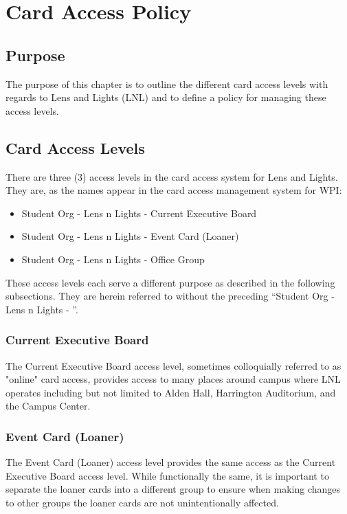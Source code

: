 \documentclass[12pt,letterpaper,oneside]{book}
\begin{document}
\chapter{Card Access Policy}

\section{Purpose}
The purpose of this chapter is to outline the different card access levels with regards to Lens and Lights (LNL) and to define a policy for managing these access levels.

\section{Card Access Levels}
There are three (3) access levels in the card access system for Lens and Lights. They are, as the names appear in the card access management system for WPI:

\begin{itemize}
    \item Student Org - Lens n Lights - Current Executive Board
    \item Student Org - Lens n Lights - Event Card (Loaner)
    \item Student Org - Lens n Lights - Office Group
\end{itemize}

These access levels each serve a different purpose as described in the following subsections. They are herein referred to without the preceding ``Student Org - Lens n Lights - ''.

\subsection{Current Executive Board}
The Current Executive Board access level, sometimes colloquially referred to as "online" card access, provides access to many places around campus where LNL operates including but not limited to Alden Hall, Harrington Auditorium, and the Campus Center.

\subsection{Event Card (Loaner)}
The Event Card (Loaner) access level provides the same access as the Current Executive Board access level. While functionally the same, it is important to separate the loaner cards into a different group to ensure when making changes to other groups the loaner cards are not unintentionally affected.
\end{document}
